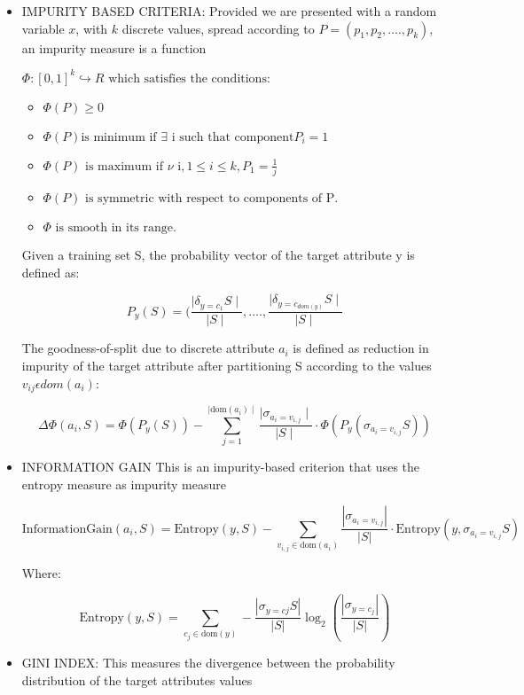\documentclass[12pt, a4paper,twoside]{report}
\numberwithin{equation}{chapter}
\begin{document}
\begin{itemize}
    \item IMPURITY BASED CRITERIA: Provided we are presented with a random variable \(x\), with \(k\) discrete values, spread according to \(P = (p_1, p_2,....,p_k)\), an impurity measure is a function

    \(\Phi: [0, 1]^k \hookrightarrow R  \text{ which satisfies the conditions:}\)

    \begin{itemize}
        \item \(\Phi (P) \geq 0 \)
        \item \(\Phi(P) \text{is minimum if } \exists \text{ i such that component} P_i = 1 \)
        \item \(\Phi (P) \text{ is maximum if } \nu \text{ i}, 1 \leq i \leq k, P_1 = \frac{1}{j}\)
        \item \(\Phi (P) \text{ is symmetric with respect to components of P. }\)
        \item \(\Phi \text{ is smooth in its range.} \)
    \end{itemize}

Given a training set S, the probability vector of the target attribute y is defined as:

\[P_y(S) = (\frac{\mid \delta_{y=c_1}S \mid}{\mid S \mid},....,\frac{\mid \delta_{y=c_{dom(y)}} S\mid}{\mid S \mid}\]

The goodness-of-split due to discrete attribute \(a_i\) is defined as reduction in impurity of the target attribute after partitioning S according to the values \(v_{ij} \epsilon dom (a_i)\):

\[
\Delta\Phi(a_i, S) = \Phi(P_y(S)) - \sum_{j=1}^{\mid \text{dom}(a_i) \mid} \frac{\mid \sigma_{a_i = v_{i,j}} \mid}{\mid S \mid} \cdot \Phi(P_y(\sigma_{a_i = v_{i,j}} S))
\]

\item INFORMATION GAIN
This is an impurity-based criterion that uses the entropy measure as impurity measure

\[
\text{InformationGain}(a_i, S) = \text{Entropy}(y, S) - \sum_{v_{i,j} \in \text{dom}(a_i)} \frac{|\sigma_{a_i = v_{i,j}}|}{|S|} \cdot \text{Entropy}\left(y, \sigma_{a_i = v_{i,j}} S\right)
\]

Where:

    \[
\text{Entropy}(y, S) = \sum_{c_j \in \text{dom}(y)} - \frac{|\sigma_{y = cj}S|}{|S|} \log_2 \left(\frac{|\sigma_{y = c_j}|}{|S|}\right)
\]

\item GINI INDEX: This measures the divergence between the probability distribution of the target attributes values



\end{itemize}
\end{document}
